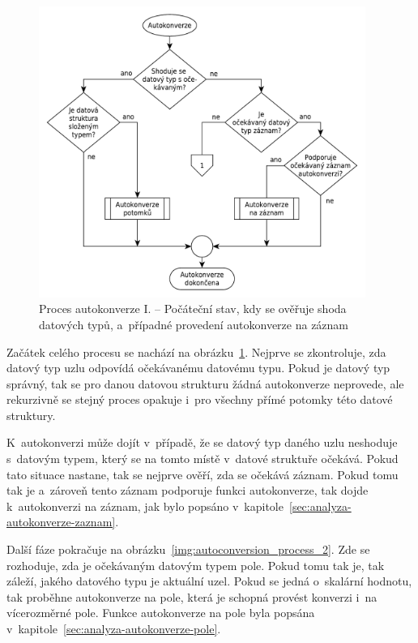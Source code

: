 \documentclass[FM,bw,DP]{tulthesis}
\begin{document}
\begin{figure}[h]
	\centering
    \includegraphics[width=0.95\textwidth]{../img/autoconversion_process.pdf}
    \caption[Proces autokonverze I.]{Proces autokonverze I. -- Počáteční stav, kdy se ověřuje shoda datových typů, a~případné provedení autokonverze na záznam}
	\label{img:autoconversion_process}
\end{figure}

Začátek celého procesu se nachází na obrázku~\ref{img:autoconversion_process}.  Nejprve se zkontroluje, zda datový typ uzlu odpovídá očekávanému datovému typu. Pokud je datový typ správný, tak se pro danou datovou strukturu žádná autokonverze neprovede, ale rekurzivně se stejný proces opakuje i~pro všechny přímé potomky této datové struktury.

K~autokonverzi může dojít v~případě, že se datový typ daného uzlu neshoduje s~datovým typem, který se na tomto místě v~datové struktuře očekává. Pokud tato situace nastane, tak se nejprve ověří, zda se očekává záznam. Pokud tomu tak je a~zároveň tento záznam podporuje funkci autokonverze, tak dojde k~autokonverzi na záznam, jak bylo popsáno v~kapitole~\ref{sec:analyza-autokonverze-zaznam}.

\clearpage

Další fáze pokračuje na obrázku~\ref{img:autoconversion_process_2}. Zde se rozhoduje, zda je očekávaným datovým typem pole. Pokud tomu tak je, tak záleží, jakého datového typu je aktuální uzel. Pokud se jedná o~skalární hodnotu, tak proběhne autokonverze na pole, která je schopná provést konverzi i~na vícerozměrné pole. Funkce autokonverze na pole byla popsána v~kapitole~\ref{sec:analyza-autokonverze-pole}.
\end{document}
